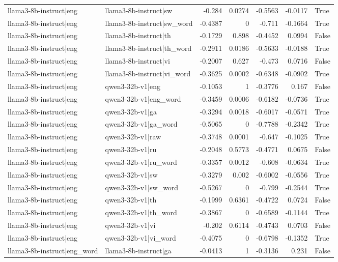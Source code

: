 \begin{table}
\begin{tabular}{l l r r r r l}
llama3-8b-instruct|eng & llama3-8b-instruct|sw & -0.284 & 0.0274 & -0.5563 & -0.0117 & True \\
llama3-8b-instruct|eng & llama3-8b-instruct|sw_word & -0.4387 & 0 & -0.711 & -0.1664 & True \\
llama3-8b-instruct|eng & llama3-8b-instruct|th & -0.1729 & 0.898 & -0.4452 & 0.0994 & False \\
llama3-8b-instruct|eng & llama3-8b-instruct|th_word & -0.2911 & 0.0186 & -0.5633 & -0.0188 & True \\
llama3-8b-instruct|eng & llama3-8b-instruct|vi & -0.2007 & 0.627 & -0.473 & 0.0716 & False \\
llama3-8b-instruct|eng & llama3-8b-instruct|vi_word & -0.3625 & 0.0002 & -0.6348 & -0.0902 & True \\
llama3-8b-instruct|eng & qwen3-32b-v1|eng & -0.1053 & 1 & -0.3776 & 0.167 & False \\
llama3-8b-instruct|eng & qwen3-32b-v1|eng_word & -0.3459 & 0.0006 & -0.6182 & -0.0736 & True \\
llama3-8b-instruct|eng & qwen3-32b-v1|ga & -0.3294 & 0.0018 & -0.6017 & -0.0571 & True \\
llama3-8b-instruct|eng & qwen3-32b-v1|ga_word & -0.5065 & 0 & -0.7788 & -0.2342 & True \\
llama3-8b-instruct|eng & qwen3-32b-v1|raw & -0.3748 & 0.0001 & -0.647 & -0.1025 & True \\
llama3-8b-instruct|eng & qwen3-32b-v1|ru & -0.2048 & 0.5773 & -0.4771 & 0.0675 & False \\
llama3-8b-instruct|eng & qwen3-32b-v1|ru_word & -0.3357 & 0.0012 & -0.608 & -0.0634 & True \\
llama3-8b-instruct|eng & qwen3-32b-v1|sw & -0.3279 & 0.002 & -0.6002 & -0.0556 & True \\
llama3-8b-instruct|eng & qwen3-32b-v1|sw_word & -0.5267 & 0 & -0.799 & -0.2544 & True \\
llama3-8b-instruct|eng & qwen3-32b-v1|th & -0.1999 & 0.6361 & -0.4722 & 0.0724 & False \\
llama3-8b-instruct|eng & qwen3-32b-v1|th_word & -0.3867 & 0 & -0.6589 & -0.1144 & True \\
llama3-8b-instruct|eng & qwen3-32b-v1|vi & -0.202 & 0.6114 & -0.4743 & 0.0703 & False \\
llama3-8b-instruct|eng & qwen3-32b-v1|vi_word & -0.4075 & 0 & -0.6798 & -0.1352 & True \\
llama3-8b-instruct|eng_word & llama3-8b-instruct|ga & -0.0413 & 1 & -0.3136 & 0.231 & False \\

\end{tabular}
\end{table}
